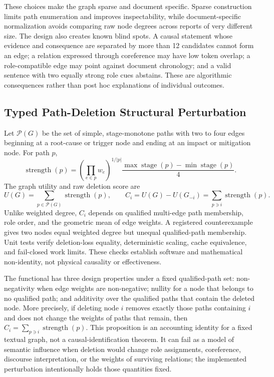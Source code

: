 \documentclass[applsci,article,submit,moreauthors]{Definitions/mdpi}
\begin{document}
These choices make the graph sparse and document specific. Sparse construction limits path enumeration and improves inspectability, while document-specific normalization avoids comparing raw node degrees across reports of very different size. The design also creates known blind spots. A causal statement whose evidence and consequence are separated by more than 12 candidates cannot form an edge; a relation expressed through coreference may have low token overlap; a role-compatible edge may point against document chronology; and a valid sentence with two equally strong role cues abstains. These are algorithmic consequences rather than post hoc explanations of individual outcomes.

\subsection{Typed Path-Deletion Structural Perturbation}

Let $\mathcal{P}(G)$ be the set of simple, stage-monotone paths with two to four edges beginning at a root-cause or trigger node and ending at an impact or mitigation node. For path $p$,
\begin{equation}
\operatorname{strength}(p)=\left(\prod_{e\in p}w_e\right)^{1/|p|}\frac{\max\operatorname{stage}(p)-\min\operatorname{stage}(p)}{4}.
\end{equation}
The graph utility and raw deletion score are
\begin{equation}
U(G)=\sum_{p\in\mathcal{P}(G)}\operatorname{strength}(p),\qquad
C_i=U(G)-U(G_{-i})=\sum_{p\ni i}\operatorname{strength}(p).
\end{equation}
Unlike weighted degree, $C_i$ depends on qualified multi-edge path membership, role order, and the geometric mean of edge weights. A registered counterexample gives two nodes equal weighted degree but unequal qualified-path membership. Unit tests verify deletion-loss equality, deterministic scaling, cache equivalence, and fail-closed work limits. These checks establish software and mathematical non-identity, not physical causality or effectiveness.

The functional has three design properties under a fixed qualified-path set: non-negativity when edge weights are non-negative; nullity for a node that belongs to no qualified path; and additivity over the qualified paths that contain the deleted node. More precisely, if deleting node $i$ removes exactly those paths containing $i$ and does not change the weights of paths that remain, then $C_i=\sum_{p\ni i}\operatorname{strength}(p)$. This proposition is an accounting identity for a fixed textual graph, not a causal-identification theorem. It can fail as a model of semantic influence when deletion would change role assignments, coreference, discourse interpretation, or the weights of surviving relations; the implemented perturbation intentionally holds those quantities fixed.
\end{document}

